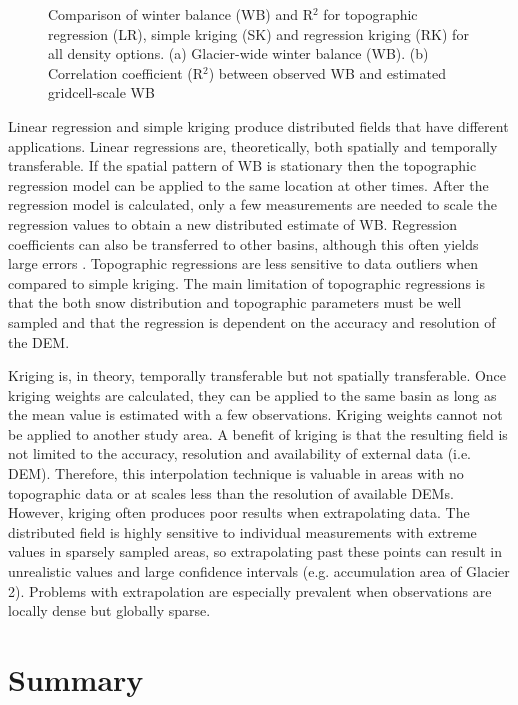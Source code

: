 \documentclass{sfuthesis}
\begin{document}
{\begin{figure}
   \caption[Comparison of winter balance (WB) and R$^2$ for topographic regression (LR), simple kriging (SK) and regression kriging (RK) for all density options]{Comparison of winter balance (WB) and R$^2$ for topographic regression (LR), simple kriging (SK) and regression kriging (RK) for all density options. (a) Glacier-wide winter balance (WB). (b) Correlation coefficient (R$^2$) between observed WB and estimated gridcell-scale WB}
	\label{fig:InterpMethod_allopts}
\end{figure}


Linear regression and simple kriging produce distributed fields that have different applications. Linear regressions are, theoretically, both spatially and temporally transferable. If the spatial pattern of WB is stationary then the topographic regression model can be applied to the same location at other times. After the regression model is calculated, only a few measurements are needed to scale the regression values to obtain a new distributed estimate of WB. Regression coefficients can also be transferred to other basins, although this often yields large errors \citep{Grunewald2010}. Topographic regressions are less sensitive to data outliers when compared to simple kriging. The main limitation of topographic regressions is that the both snow distribution and topographic parameters must be well sampled and that the regression is dependent on the accuracy and resolution of the DEM. 

Kriging is, in theory, temporally transferable but not spatially transferable. Once kriging weights are calculated, they can be applied to the same basin as long as the mean value is estimated with a few observations. Kriging weights cannot not be applied to another study area. A benefit of kriging is that the resulting field is not limited to the accuracy, resolution and availability of external data (i.e. DEM). Therefore, this interpolation technique is valuable in areas with no topographic data or at scales less than the resolution of available DEMs. However, kriging often produces poor results when extrapolating data. The distributed field is highly sensitive to individual measurements with extreme values in sparsely sampled areas, so extrapolating past these points can result in unrealistic values and large confidence intervals (e.g. accumulation area of Glacier 2). Problems with extrapolation are especially prevalent when observations are locally dense but globally sparse.



\section{Summary}

}
\end{document}
